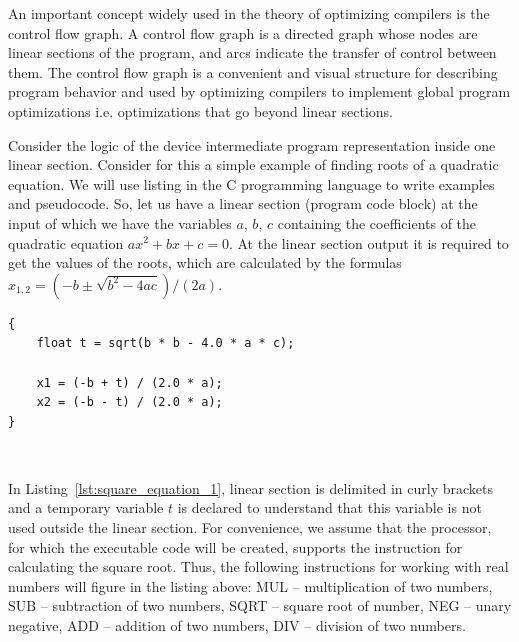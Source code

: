 \documentclass[
11pt,%
tightenlines,%
twoside,%
onecolumn,%
nofloats,%
nobibnotes,%
nofootinbib,%
superscriptaddress,%
noshowpacs,%
centertags]%
{revtex4}
\begin{document}
An important concept widely used in the theory of optimizing compilers is the control flow graph. A control flow graph is a directed graph whose nodes are linear sections of the program, and arcs indicate the transfer of control between them. The control flow graph is a convenient and visual structure for describing program behavior and used by optimizing compilers to implement global program optimizations i.e. optimizations that go beyond linear sections.

Consider the logic of the device intermediate program representation inside one linear section. Consider for this a simple example of finding roots of a quadratic equation. We will use listing in the C programming language to write examples and pseudocode. So, let us have a linear section (program code block) at the input of which we have the variables $a$, $b$, $c$ containing the coefficients of the quadratic equation $ax^2 + bx + c = 0$. At the linear section output it is required to get the values of the roots, which are calculated by the formulas $x_{1,2} = (-b \pm \sqrt{b^2 - 4ac})/(2a)$.

\begin{lstlisting}[caption={The code block for calculating the roots of the quadratic equation.},label={lst:square_equation_1}]
{
    float t = sqrt(b * b - 4.0 * a * c);
    
    x1 = (-b + t) / (2.0 * a);
    x2 = (-b - t) / (2.0 * a);
}
\end{lstlisting}

\

In Listing~\ref{lst:square_equation_1}, linear section is delimited in curly brackets and a temporary variable $t$ is declared to understand that this variable is not used outside the linear section. For convenience, we assume that the processor, for which the executable code will be created, supports the instruction for calculating the square root. Thus, the following instructions for working with real numbers will figure in the listing above: MUL -- multiplication of two numbers, SUB -- subtraction of two numbers, SQRT -- square root of number, NEG -- unary negative, ADD -- addition of two numbers, DIV -- division of two numbers.
\end{document}
